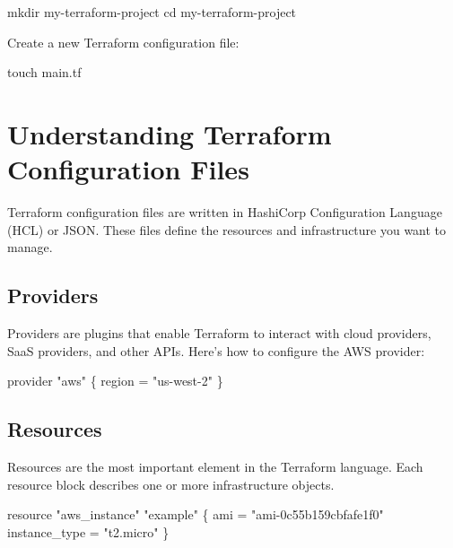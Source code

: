 \documentclass[
  letterpaper,
  DIV=11,
  numbers=noendperiod]{scrreprt}
\newenvironment{Shaded}{\begin{snugshade}}{\end{snugshade}}
\newcommand{\BuiltInTok}[1]{\textcolor[rgb]{0.00,0.23,0.31}{#1}}
\newcommand{\FunctionTok}[1]{\textcolor[rgb]{0.28,0.35,0.67}{#1}}
\newcommand{\NormalTok}[1]{\textcolor[rgb]{0.00,0.23,0.31}{#1}}
\begin{document}
\begin{Shaded}
\begin{Highlighting}[]
\FunctionTok{mkdir}\NormalTok{ my{-}terraform{-}project}
\BuiltInTok{cd}\NormalTok{ my{-}terraform{-}project}
\end{Highlighting}
\end{Shaded}

Create a new Terraform configuration file:

\begin{Shaded}
\begin{Highlighting}[]
\FunctionTok{touch}\NormalTok{ main.tf}
\end{Highlighting}
\end{Shaded}

\section{Understanding Terraform Configuration
Files}\label{understanding-terraform-configuration-files}

Terraform configuration files are written in HashiCorp Configuration
Language (HCL) or JSON. These files define the resources and
infrastructure you want to manage.

\subsection{Providers}\label{providers}

Providers are plugins that enable Terraform to interact with cloud
providers, SaaS providers, and other APIs. Here's how to configure the
AWS provider:

\begin{Shaded}
\begin{Highlighting}[]
\NormalTok{provider "aws" \{}
\NormalTok{  region = "us{-}west{-}2"}
\NormalTok{\}}
\end{Highlighting}
\end{Shaded}

\subsection{Resources}\label{resources}

Resources are the most important element in the Terraform language. Each
resource block describes one or more infrastructure objects.

\begin{Shaded}
\begin{Highlighting}[]
\NormalTok{resource "aws\_instance" "example" \{}
\NormalTok{  ami           = "ami{-}0c55b159cbfafe1f0"}
\NormalTok{  instance\_type = "t2.micro"}
\NormalTok{\}}
\end{Highlighting}
\end{Shaded}
\end{document}
